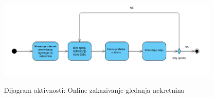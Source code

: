 \documentclass[20pt]{article}
\begin{document}
\begin{figure}[h]
		\centering
		\includegraphics[width=1.1\textwidth,height=0.35\textheight] {Pictures/DijagramAktivnostiOnlineZakazivanjeGledanja.png}\\
		\caption{Dijagram aktivnosti: Online zakazivanje gledanja nekretnina}
		\label{fig:dijagramAktivnostiOnlineZakazivanjeGledanja}
	\end{figure}

\newpage
{}
\setlength{\parindent}{1cm}
\fontsize{13}{18} \selectfont 
\end{document}
